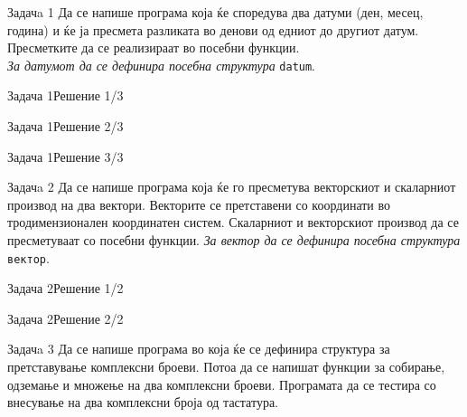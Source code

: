 
\begin{frame}{Задачa 1}
Да се напише програма која ќе споредува два датуми (ден, месец, година) и ќе ја
пресмета разликата во денови од едниот до другиот датум. Пресметките да се
реализираат во посебни функции.\\
\emph{За датумот да се дефинира посебна структура} \texttt{datum}.
\end{frame}

\begin{frame}[fragile]{Задача 1}{Решение 1/3}

\end{frame}

\begin{frame}[fragile]{Задача 1}{Решение 2/3}

\end{frame}

\begin{frame}[fragile]{Задача 1}{Решение 3/3}

\end{frame}

\begin{frame}{Задачa 2}
Да се напише програма која ќе го пресметува векторскиот и скаларниот производ на
два вектори. Векторите се претставени со координати во тродимензионален
координатен систем. Скаларниот и векторскиот производ да се пресметуваат со
посебни функции.
\emph{За вектор да се дефинира посебна структура} \texttt{вектор}.
\end{frame}

\begin{frame}[fragile]{Задача 2}{Решение 1/2}

\end{frame}

\begin{frame}[fragile]{Задача 2}{Решение 2/2}

\end{frame}

\begin{frame}{Задачa 3}
Да се напише програма во која ќе се дефинира структура за претставување
комплексни броеви. Потоа да се напишат функции за собирање, одземање и множење
на два комплексни броеви. Програмата да се тестира со внесување на два
комплексни броја од тастатура.
\end{frame}

